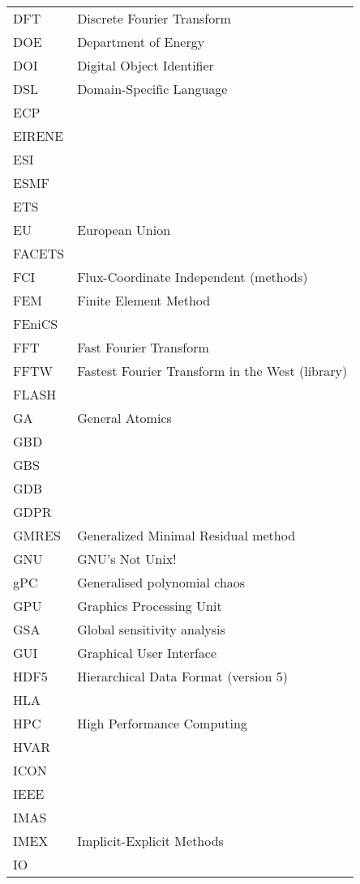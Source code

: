 \begin{longtable}{|p{4.0cm}|p{12.0cm}|}
DFT & Discrete Fourier Transform \\
DOE & Department of Energy \\
DOI & Digital Object Identifier \\
DSL & Domain-Specific Language \\
ECP & \\
EIRENE & \\
ESI & \\
ESMF & \\
ETS & \\
EU & European Union \\
FACETS & \\
FCI & Flux-Coordinate Independent (methods) \\
FEM & Finite Element Method \\
FEniCS & \\
FFT & Fast Fourier Transform \\
FFTW & Fastest Fourier Transform in the West (library) \\
FLASH & \\
GA & General Atomics \\
GBD & \\
GBS & \\
GDB & \\
GDPR & \\
GMRES & Generalized Minimal Residual method \\
GNU & GNU's Not Unix! \\
gPC & Generalised polynomial chaos \\
GPU & Graphics Processing Unit \\
GSA & Global sensitivity analysis \\
GUI & Graphical User Interface \\
HDF5 & Hierarchical Data Format (version 5) \\
HLA & \\
HPC & High Performance Computing \\
HVAR & \\
ICON & \\
IEEE & \\
IMAS & \\
IMEX & Implicit-Explicit Methods \\
IO & \\

\end{longtable}

